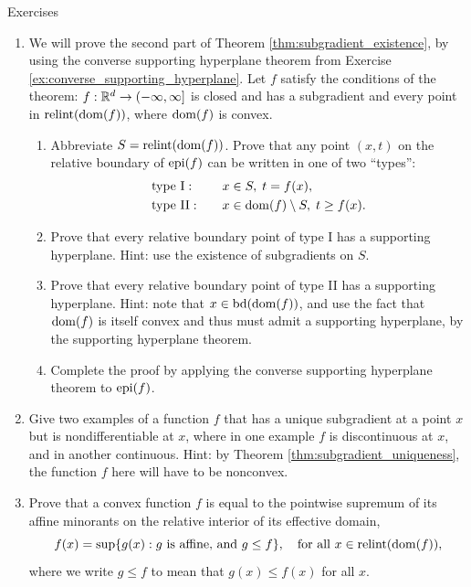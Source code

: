 \begin{xcb}{Exercises}
\begin{enumerate}[label=\thechapter.\arabic*]
\item \label{ex:subdifferentiability_implies_convexity}
  We will prove the second part of Theorem \ref{thm:subgradient_existence}, by 
  using the converse supporting hyperplane theorem from Exercise
  \ref{ex:converse_supporting_hyperplane}. Let $f$ satisfy the conditions of the 
  theorem: $f : \mathbb{R}^d \to (-\infty, \infty]$ is closed and has a subgradient and   
  every point in $\operatorname{relint}(\operatorname{dom}(f))$, where $\operatorname{dom}(f)$ is convex.

\begin{enumerate}[label=\alph*.]
\item Abbreviate $S = \operatorname{relint}(\operatorname{dom}(f))$. Prove that any point $(x,t)$ on the
  relative boundary of $\operatorname{epi}(f)$ can be written in one of two ``types'': 
  \begin{alignat*}{2}
  &\text{type I}: \quad &&x \in S, \; t = f(x), \\
  &\text{type II}: \quad &&x \in \operatorname{dom}(f) \setminus S, \; t \geq f(x). 
  \end{alignat*}

\item Prove that every relative boundary point of type I has a supporting
  hyperplane. Hint: use the existence of subgradients on $S$.

\item Prove that every relative boundary point of type II has a supporting
  hyperplane. Hint: note that $x \in \operatorname{bd}(\operatorname{dom}(f))$, and use the fact that
  $\operatorname{dom}(f)$ is itself convex and thus must admit a supporting hyperplane, by the 
  supporting hyperplane theorem.

\item Complete the proof by applying the converse supporting hyperplane theorem
  to $\operatorname{epi}(f)$. 
\end{enumerate}

\item \label{ex:subgradient_nonuniqueness} 
  Give two examples of a function $f$ that has a unique subgradient at a point
  $x$ but is nondifferentiable at $x$, where in one example $f$ is discontinuous 
  at $x$, and in another continuous. Hint: by Theorem
  \ref{thm:subgradient_uniqueness}, the function $f$ here will have to be  
  nonconvex.

\item \label{ex:affine_minorant}
  Prove that a convex function $f$ is equal to the pointwise supremum of its
  affine minorants on the relative interior of its effective domain, 
  \[
  f(x) = \sup \{ g(x) : \text{$g$ is affine, and $g \leq f$} \}, \quad \text{for
    all $x \in \operatorname{relint}(\operatorname{dom}(f))$},
  \]
  where we write $g \leq f$ to mean that $g(x) \leq f(x)$ for all $x$.


\end{enumerate}
\end{xcb}
